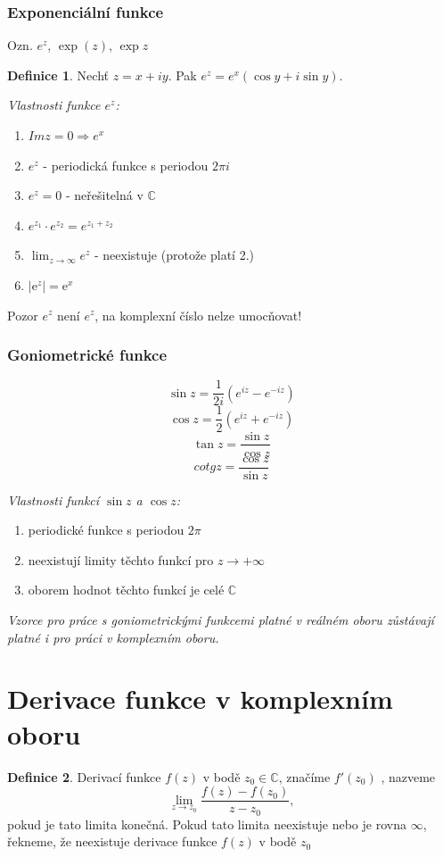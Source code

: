 \documentclass[a4]{report}
\theoremstyle{definition}
\newtheorem{definition}{Definice}[section]
\begin{document}
\subsubsection{Exponenciální funkce}
Ozn. $e^z$, $\exp(z)$, $\exp z$
\begin{definition}
Nechť $z=x+iy$. Pak $e^z=e^x(\cos y +i\sin y)$.
\end{definition}

\textit{Vlastnosti funkce $e^z$:} 
\begin{enumerate}
\item $Im z= 0 \Rightarrow e^x$
\item $e^z$ - periodická funkce s periodou $2\pi i$
\item $e^z=0$ - neřešitelná v $\mathbb{C}$
\item $e^{z_1}\cdot e^{z_2}=e^{z_1+z_2}$
\item $\lim_{z \to \infty}e^z$ - neexistuje (protože platí 2.)
\item $|\mathrm{e}^{z}|=\mathrm{e}^x$ 
\end{enumerate}

Pozor $e^z$ není $e^z$, na komplexní číslo nelze umocňovat!

\subsubsection{Goniometrické funkce}

$$\sin z = \frac{1}{2i}(e^{iz}-e^{-iz})$$
$$\cos z = \frac{1}{2}(e^{iz}+e^{-iz})$$
$$\tan z = \frac{\sin z}{\cos z}$$
$$cotg z = \frac{\cos z}{\sin z}$$

\textit{Vlastnosti funkcí $\sin z$ a $\cos z$:} 
\begin{enumerate}
\item periodické funkce s periodou $2\pi$
\item neexistují limity těchto funkcí pro $z\rightarrow +\infty$
\item oborem hodnot těchto funkcí je celé $\mathbb{C}$
\end{enumerate}

\textit{Vzorce pro práce s goniometrickými funkcemi platné v reálném oboru zůstávají platné i pro práci v komplexním oboru.}

\section{Derivace funkce v komplexním oboru} 

\begin{definition}
Derivací funkce $f(z)$ v bodě $z_0\in\mathbb{C}$, značíme $f'(z_0)$ , nazveme $$\lim_{z\to z_0}\frac{f(z)-f(z_0)}{z-z_0},$$pokud je tato limita konečná. Pokud tato limita neexistuje nebo je rovna $\infty$, řekneme, že neexistuje derivace funkce $f(z) $ v bodě $z_0$
\end{definition}
\end{document}
